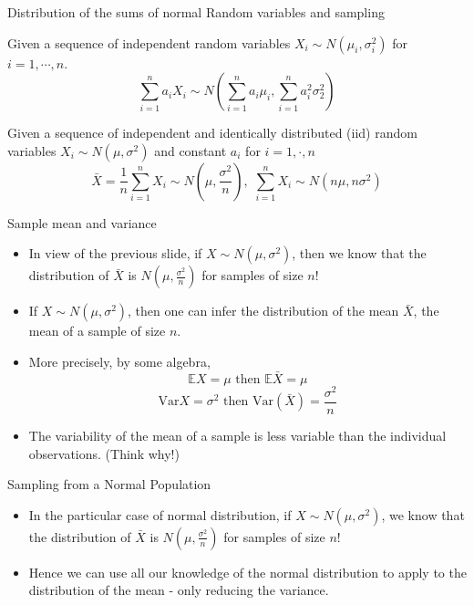 \documentclass[ignorenonframetext,]{beamer}
\begin{document}
\begin{frame}{Distribution of the sums of normal Random variables and
sampling}

Given a sequence of independent random variables
\(X_i\sim N(\mu_i,\sigma^2_i)\) for \(i=1,\cdots,n\).
\[\sum^n_{i=1}a_i X_i\sim N(\sum^n_{i=1}a_i\mu_i,\sum^n_{i=1}a^2_i\sigma^2_2)\]

Given a sequence of independent and identically distributed (iid) random
variables \(X_i\sim N(\mu,\sigma^2)\) and constant \(a_i\) for
\(i=1,\cdot,n\)
\[\bar{X}=\frac{1}{n}\sum^n_{i=1}X_i\sim N(\mu,\frac{\sigma^2}{n}),\,\,\sum^n_{i=1}X_i\sim N(n\mu,n\sigma^2)\]

\end{frame}

\begin{frame}{Sample mean and variance}

\begin{itemize}
\item
  In view of the previous slide, if \(X\sim N(\mu,\sigma^2)\), then we
  know that the distribution of \(\bar{X}\) is
  \(N(\mu,\frac{\sigma^2}{n})\) for samples of size \(n\)!
\item
  If \(X\sim N(\mu,\sigma^2)\), then one can infer the distribution of
  the mean \(\bar{X}\), the mean of a sample of size \(n\).
\item
  More precisely, by some algebra,
  \[\mathbb{E}X=\mu\,\,\text{then}\,\,\mathbb{E}\bar{X}=\mu\]
  \[\text{Var}X=\sigma^2\,\,\text{then}\,\,\text{Var}(\bar{X})=\frac{\sigma^2}{n}\]
\item
  {The variability of the mean of a sample is less variable than the
  individual observations.} (Think why!)
\end{itemize}

\end{frame}

\begin{frame}{Sampling from a Normal Population}

\begin{itemize}
\item
  In the particular case of normal distribution, if
  \(X\sim N(\mu,\sigma^2)\), we know that the distribution of
  \(\bar{X}\) is \(N(\mu,\frac{\sigma^2}{n})\) for samples of size
  \(n\)!
\item
  Hence we can use all our knowledge of the normal distribution to apply
  to the distribution of the mean - only reducing the variance.
\end{itemize}

\end{frame}
\end{document}
